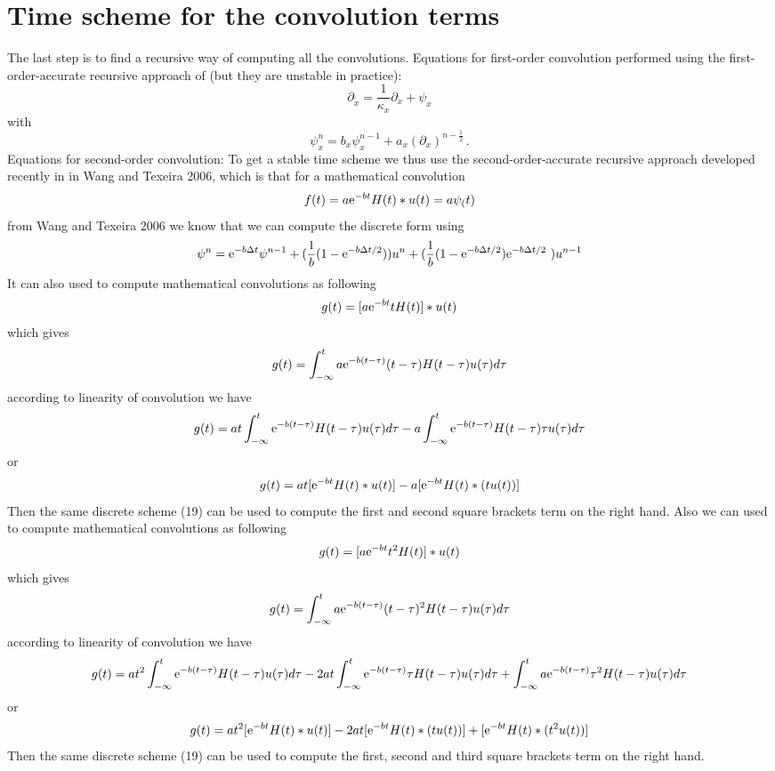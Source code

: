 \documentclass[onecolumn,extra]{gji_modified_cours_UPPA}
\renewcommand{\cite}[1]{\citet{#1}}
\begin{document}
\section{Time scheme for the convolution terms}
The last step is to find a recursive way of computing all the convolutions.
Equations for first-order convolution
performed using the first-order-accurate recursive approach of \cite{LuHu92}
(but they are unstable in practice):
\begin{equation}
\partial_{\tilde{x}} = \frac{1}{\kappa_x} \partial_ x + \psi_x
\label{memory_variable_replace}
\end{equation}
%
with
\begin{equation}
\psi_x^n = b_x \psi_x^{n - 1} + a_x \left(\partial_ x\right)^{n - \frac{1}{2}} \, .
\label{time_evolution_psi}
\end{equation}
%
Equations for second-order convolution:
%
To get a stable time scheme we thus use the second-order-accurate recursive approach developed recently in in Wang and Texeira 2006,
which is that for a mathematical convolution
$$f(t) = a {\rm e}^{-bt} H(t) * u(t) = a \psi_(t)$$
from Wang and Texeira 2006 we know that we can compute the discrete form using
\begin{equation}
\psi^n = {\rm e}^{-b \Delta t} \psi^{n-1} + (\frac{1}{b} (1 - {\rm e}^{-b \Delta t /2})) u^n
+ (\frac{1}{b} (1 - {\rm e}^{-b \Delta t /2 }) {\rm e}^{-b \Delta t /2} \ ) u^{n-1}
\end{equation}
%
It can also used to compute mathematical convolutions as following
$$g(t) = [a {\rm e}^{-bt} t H(t)] * u(t)$$
which gives
$$g(t) = \int_{-\infty}^{t} a {\rm e}^{-b (t-\tau)} (t-\tau) H(t-\tau) u(\tau) d \tau$$
according to linearity of convolution we have
$$g(t) = at\int_{-\infty}^{t}  {\rm e}^{-b (t-\tau)} H(t-\tau) u(\tau) d \tau - a\int_{-\infty}^{t}  {\rm e}^{-b (t-\tau)} H(t-\tau) \tau u(\tau) d \tau $$
or
$$g(t) = at [  {\rm e}^{-bt} H(t) * u(t)] - a [ {\rm e}^{-bt} H(t) * (t u(t))] $$
Then the same discrete scheme (19) can be used to compute the first and second  square brackets term on the right hand.
%
Also we can used to compute mathematical convolutions as following
$$g(t) = [a {\rm e}^{-bt} t^2 H(t)] * u(t)$$
which gives
$$g(t) = \int_{-\infty}^{t} a {\rm e}^{-b (t-\tau)} (t-\tau)^2 H(t-\tau) u(\tau) d \tau$$
according to linearity of convolution we have
$$g(t) = at^2\int_{-\infty}^{t}  {\rm e}^{-b (t-\tau)}  H(t-\tau) u(\tau) d \tau -
2at\int_{-\infty}^{t}  {\rm e}^{-b (t-\tau)}  \tau H(t-\tau) u(\tau) d \tau+
\int_{-\infty}^{t} a {\rm e}^{-b (t-\tau)} \tau^2 H(t-\tau) u(\tau) d \tau$$
or
$$g(t) = at^2[{\rm e}^{-bt} H(t) * u(t)] -
2at[{\rm e}^{-bt} H(t) * (t u(t))]+
[ {\rm e}^{-bt} H(t) * (t^2 u(t))]$$
Then the same discrete scheme (19) can be used to compute the first, second and third square brackets term on the right hand.
%
%
%
%
%
%

%
\end{document}
